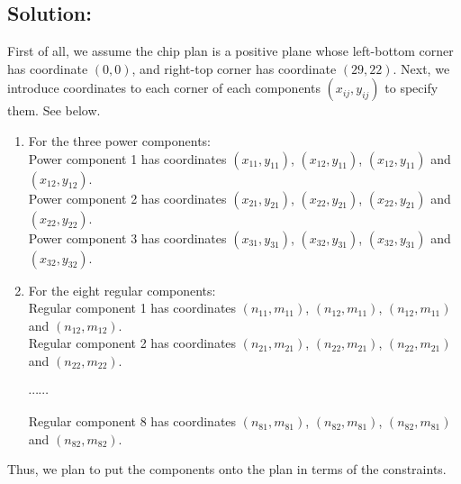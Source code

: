 \documentclass[11pt]{article}
\begin{document}
\vspace{4mm}

\subsection*{Solution:}
First of all, we assume the chip plan is a positive plane whose left-bottom corner has coordinate $(0, 0)$, and right-top corner has coordinate $(29, 22)$.
Next, we introduce coordinates to each corner of each components $(x_{ij}, y_{ij})$ to specify them.
See below.

\begin{enumerate}
  \item For the three power components:\\
  Power component 1 has coordinates $(x_{11}, y_{11})$, $(x_{12}, y_{11})$, $(x_{12}, y_{11})$ and $(x_{12}, y_{12})$.\\
  Power component 2 has coordinates $(x_{21}, y_{21})$, $(x_{22}, y_{21})$, $(x_{22}, y_{21})$ and $(x_{22}, y_{22})$.\\
  Power component 3 has coordinates $(x_{31}, y_{31})$, $(x_{32}, y_{31})$, $(x_{32}, y_{31})$ and $(x_{32}, y_{32})$.
  \item For the eight regular components:\\
  Regular component 1 has coordinates $(n_{11}, m_{11})$, $(n_{12}, m_{11})$, $(n_{12}, m_{11})$ and $(n_{12}, m_{12})$.\\
  Regular component 2 has coordinates $(n_{21}, m_{21})$, $(n_{22}, m_{21})$, $(n_{22}, m_{21})$ and $(n_{22}, m_{22})$.

  $\cdots \cdots$

  Regular component 8 has coordinates $(n_{81}, m_{81})$, $(n_{82}, m_{81})$, $(n_{82}, m_{81})$ and $(n_{82}, m_{82})$.
\end{enumerate}
Thus, we plan to put the components onto the plan in terms of the constraints.
\end{document}
